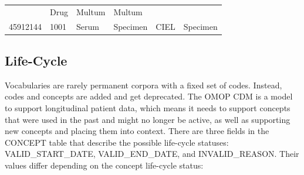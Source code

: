\documentclass[11pt]{book}
\theoremstyle{definition}
\theoremstyle{definition}
\theoremstyle{definition}
\theoremstyle{remark}
\begin{document}
\begin{longtable}[]{@{}llllll@{}}
\begin{minipage}[t]{0.16\columnwidth}
\end{minipage} & \begin{minipage}[t]{0.14\columnwidth}\raggedright\strut
Drug\strut
\end{minipage} & \begin{minipage}[t]{0.14\columnwidth}\raggedright\strut
Multum\strut
\end{minipage} & \begin{minipage}[t]{0.14\columnwidth}\raggedright\strut
Multum\strut
\end{minipage}\tabularnewline
\begin{minipage}[t]{0.13\columnwidth}\raggedright\strut
45912144\strut
\end{minipage} & \begin{minipage}[t]{0.07\columnwidth}\raggedright\strut
1001\strut
\end{minipage} & \begin{minipage}[t]{0.16\columnwidth}\raggedright\strut
Serum\strut
\end{minipage} & \begin{minipage}[t]{0.14\columnwidth}\raggedright\strut
Specimen\strut
\end{minipage} & \begin{minipage}[t]{0.14\columnwidth}\raggedright\strut
CIEL\strut
\end{minipage} & \begin{minipage}[t]{0.14\columnwidth}\raggedright\strut
Specimen\strut
\end{minipage}\tabularnewline
\bottomrule
\end{longtable}

\subsection{Life-Cycle}\label{conceptLifeCycle}

Vocabularies are rarely permanent corpora with a fixed set of codes.
Instead, codes and concepts are added and get deprecated. The OMOP CDM
is a model to support longitudinal patient data, which means it needs to
support concepts that were used in the past and might no longer be
active, as well as supporting new concepts and placing them into
context. There are three fields in the CONCEPT table that describe the
possible life-cycle statuses: VALID\_START\_DATE, VALID\_END\_DATE, and
INVALID\_REASON. Their values differ depending on the concept life-cycle
status:
\end{document}
